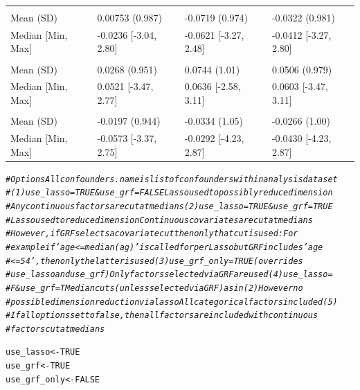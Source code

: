 \documentclass[smallextended]{svjour3}
\makeatletter
\newcommand{\hlnum}[1]{\textcolor[rgb]{0.686,0.059,0.569}{#1}}%
\newcommand{\hlcom}[1]{\textcolor[rgb]{0.678,0.584,0.686}{\textit{#1}}}%
\newcommand{\hlstd}[1]{\textcolor[rgb]{0.345,0.345,0.345}{#1}}%
\newcommand{\hlkwb}[1]{\textcolor[rgb]{0.69,0.353,0.396}{#1}}%
\newenvironment{kframe}{%
 \def\at@end@of@kframe{}%
 \ifinner\ifhmode%
  \def\at@end@of@kframe{\end{minipage}}%
  \begin{minipage}{\columnwidth}%
 \fi\fi%
 \def\FrameCommand##1{\hskip\@totalleftmargin \hskip-\fboxsep
 \colorbox{shadecolor}{##1}\hskip-\fboxsep
     \hskip-\linewidth \hskip-\@totalleftmargin \hskip\columnwidth}%
 \MakeFramed {\advance\hsize-\width
   \@totalleftmargin\z@ \linewidth\hsize
   \@setminipage}}%
 {\par\unskip\endMakeFramed%
 \at@end@of@kframe}
\newenvironment{knitrout}{}{} %
\makeatother
\begin{document}
\begin{knitrout}
\begin{tabular}[t]{llll}
\addlinespace[0.3em]
\multicolumn{4}{l}{\textbf{noise1}}\\
\hspace{1em}Mean (SD) & 0.00753 (0.987) & -0.0719 (0.974) & -0.0322 (0.981)\\
\hspace{1em}Median [Min, Max] & -0.0236 [-3.04, 2.80] & -0.0621 [-3.27, 2.48] & -0.0412 [-3.27, 2.80]\\
\addlinespace[0.3em]
\multicolumn{4}{l}{\textbf{noise2}}\\
\hspace{1em}Mean (SD) & 0.0268 (0.951) & 0.0744 (1.01) & 0.0506 (0.979)\\
\hspace{1em}Median [Min, Max] & 0.0521 [-3.47, 2.77] & 0.0636 [-2.58, 3.11] & 0.0603 [-3.47, 3.11]\\
\addlinespace[0.3em]
\multicolumn{4}{l}{\textbf{noise3}}\\
\hspace{1em}Mean (SD) & -0.0197 (0.944) & -0.0334 (1.05) & -0.0266 (1.00)\\
\hspace{1em}Median [Min, Max] & -0.0573 [-3.37, 2.75] & -0.0292 [-4.23, 2.87] & -0.0430 [-4.23, 2.87]\\
\bottomrule
\end{tabular}

\begin{kframe}\begin{alltt}
\hlcom{# Options Allconfounders.name is list of confounders within analysis dataset}
\hlcom{# (1) use_lasso=TRUE & use_grf=FALSE Lasso used to possibly reduce dimension}
\hlcom{# Any continuous factors are cut at medians (2) use_lasso=TRUE & use_grf=TRUE}
\hlcom{# Lasso used to reduce dimension Continuous covariates are cut at medians}
\hlcom{# However, if GRF selects a covariate cut then only that cut is used: For}
\hlcom{# example if 'age <= median(ag)' is called for per Lasso but GRF includes 'age}
\hlcom{# <= 54', then only the latter is used (3) use_grf_only = TRUE (overrides}
\hlcom{# use_lasso and use_grf) Only factors selected via GRF are used (4) use_lasso =}
\hlcom{# F & use_grf =T Median cuts (unless selected via GRF) as in (2) However no}
\hlcom{# possible dimension reduction via lasso All categorical factors included (5)}
\hlcom{# If all options set to false, then all factors are included with continuous}
\hlcom{# factors cut at medians}

\hlstd{use_lasso} \hlkwb{<-} \hlnum{TRUE}
\hlstd{use_grf} \hlkwb{<-} \hlnum{TRUE}
\hlstd{use_grf_only} \hlkwb{<-} \hlnum{FALSE}


\end{alltt}
\end{kframe}
\end{knitrout}
\end{document}
